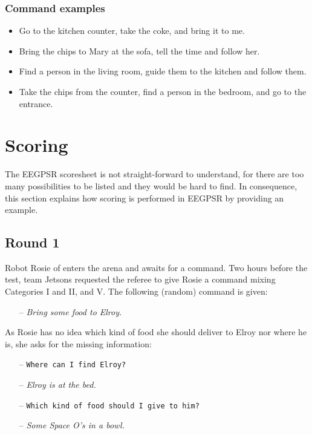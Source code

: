 \subsubsection{Command examples}
\begin{itemize}
	\item Go to the kitchen counter, take the coke, and bring it to me.
	\item Bring the chips to Mary at the sofa, tell the time and follow her.
	\item Find a person in the living room, guide them to the kitchen and follow them.
	\item Take the chips from the counter, find a person in the bedroom, and go to the entrance.
\end{itemize}



\section{Scoring}
The EEGPSR scoresheet is not straight-forward to understand, for there are too many possibilities to be listed and they would be hard to find. In consequence, this section explains how scoring is performed in EEGPSR by providing an example.

\subsection{Round 1}
Robot Rosie of enters the arena and awaits for a command. Two hours before the test, team Jetsons requested the referee to give Rosie a command mixing Categories I and II, and V. The following (random) command is given:

\begin{itemize}
	\item[--] \textit{Bring some food to Elroy.}
\end{itemize}

As Rosie has no idea which kind of food she should deliver to Elroy nor where he is, she asks for the missing information:

\begin{itemize}
	\item[--] \texttt{Where can I find Elroy?}
	\item[--] \textit{Elroy is at the bed.}
	\item[--] \texttt{Which kind of food should I give to him?}
	\item[--] \textit{Some Space O's in a bowl.}
\end{itemize}

